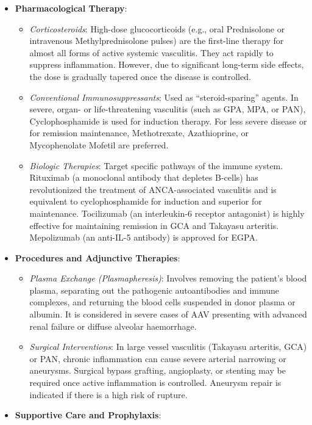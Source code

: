 \begin{itemize}
\item \textbf{Pharmacological Therapy}:
  \begin{itemize}
  \item \textit{Corticosteroids}: High-dose glucocorticoids (e.g., oral Prednisolone or intravenous Methylprednisolone pulses) are the first-line therapy for almost all forms of active systemic vasculitis. They act rapidly to suppress inflammation. However, due to significant long-term side effects, the dose is gradually tapered once the disease is controlled.
  \item \textit{Conventional Immunosuppressants}: Used as ``steroid-sparing'' agents. In severe, organ- or life-threatening vasculitis (such as GPA, MPA, or PAN), Cyclophosphamide is used for induction therapy. For less severe disease or for remission maintenance, Methotrexate, Azathioprine, or Mycophenolate Mofetil are preferred.
  \item \textit{Biologic Therapies}: Target specific pathways of the immune system. Rituximab (a monoclonal antibody that depletes B-cells) has revolutionized the treatment of ANCA-associated vasculitis and is equivalent to cyclophosphamide for induction and superior for maintenance. Tocilizumab (an interleukin-6 receptor antagonist) is highly effective for maintaining remission in GCA and Takayasu arteritis. Mepolizumab (an anti-IL-5 antibody) is approved for EGPA.
  \end{itemize}
\item \textbf{Procedures and Adjunctive Therapies}:
  \begin{itemize}
  \item \textit{Plasma Exchange (Plasmapheresis)}: Involves removing the patient's blood plasma, separating out the pathogenic autoantibodies and immune complexes, and returning the blood cells suspended in donor plasma or albumin. It is considered in severe cases of AAV presenting with advanced renal failure or diffuse alveolar haemorrhage.
  \item \textit{Surgical Interventions}: In large vessel vasculitis (Takayasu arteritis, GCA) or PAN, chronic inflammation can cause severe arterial narrowing or aneurysms. Surgical bypass grafting, angioplasty, or stenting may be required once active inflammation is controlled. Aneurysm repair is indicated if there is a high risk of rupture.
  \end{itemize}
\item \textbf{Supportive Care and Prophylaxis}:

\end{itemize}
